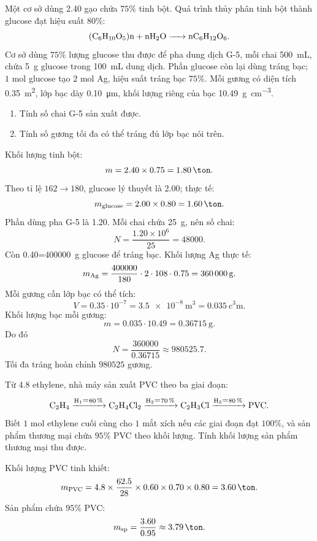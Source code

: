 \begin{tuluyen}
Một cơ sở dùng \SI{2.40}{\ton} gạo chứa \(75\%\) tinh bột. Quá trình thủy phân tinh bột thành glucose đạt hiệu suất \(80\%\):
\[
\ce{(C6H10O5)n + nH2O -> nC6H12O6}.
\]
Cơ sở dùng \(75\%\) lượng glucose thu được để pha dung dịch G-5, mỗi chai \SI{500}{\milli\liter}, chứa \SI{5}{\gram} glucose trong \SI{100}{\milli\liter} dung dịch. Phần glucose còn lại dùng tráng bạc; \(1\) mol glucose tạo \(2\) mol Ag, hiệu suất tráng bạc \(75\%\). Mỗi gương có diện tích \SI{0.35}{\square\metre}, lớp bạc dày \SI{0.10}{\micro\metre}, khối lượng riêng của bạc \SI{10.49}{\gram\per\cubic\centi\metre}.
\begin{enumerate}
\item Tính số chai G-5 sản xuất được.
\item Tính số gương tối đa có thể tráng đủ lớp bạc nói trên.
\end{enumerate}
\begin{loigiaiBT}
Khối lượng tinh bột:
\[
m=2.40\times0.75=\SI{1.80}{\ton}.
\]
Theo tỉ lệ \(162\to180\), glucose lý thuyết là \SI{2.00}{\ton}; thực tế:
\[
m_{\text{glucose}}=2.00\times0.80=\SI{1.60}{\ton}.
\]
Phần dùng pha G-5 là \SI{1.20}{\ton}. Mỗi chai chứa \SI{25}{\gram}, nên số chai:
\[
N=\frac{1.20\times10^6}{25}=48000.
\]
Còn \SI{0.40}{\ton}=\SI{400000}{\gram} glucose để tráng bạc.
Khối lượng Ag thực tế:
\[
m_{\ce{Ag}}=\frac{400000}{180}\cdot2\cdot108\cdot0.75
=\SI{360000}{\gram}.
\]
Mỗi gương cần lớp bạc có thể tích:
\[
V=0.35\cdot10^{-7}=\SI{3.5e-8}{\cubic\metre}
=\SI{0.035}{\cubic\centi\metre}.
\]
Khối lượng bạc mỗi gương:
\[
m=0.035\cdot10.49=\SI{0.36715}{\gram}.
\]
Do đó
\[
N=\frac{360000}{0.36715}\approx980525.7.
\]
Tối đa tráng hoàn chỉnh \(980525\) gương.
\end{loigiaiBT}
\end{tuluyen}

\begin{tuluyen}
Từ \SI{4.8}{\ton} ethylene, nhà máy sản xuất PVC theo ba giai đoạn:
\[
\ce{C2H4 ->[H_1=60\%] C2H4Cl2 ->[H_2=70\%] C2H3Cl ->[H_3=80\%] PVC}.
\]
Biết \(1\) mol ethylene cuối cùng cho \(1\) mắt xích  nếu các giai đoạn đạt \(100\%\), và sản phẩm thương mại chứa \(95\%\) PVC theo khối lượng. Tính khối lượng sản phẩm thương mại thu được.
\begin{loigiaiBT}
Khối lượng PVC tinh khiết:
\[
m_{\mathrm{PVC}}
=4.8\times\frac{62.5}{28}\times0.60\times0.70\times0.80
=\SI{3.60}{\ton}.
\]
Sản phẩm chứa \(95\%\) PVC:
\[
m_{\text{sp}}=\frac{3.60}{0.95}\approx\SI{3.79}{\ton}.
\]
\end{loigiaiBT}
\end{tuluyen}

